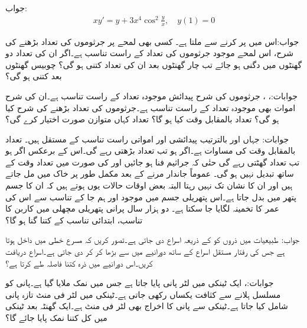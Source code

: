 جواب:
\begin{align*}
xy'=y+3x^4\cos^2 \frac{y}{x},\quad y(1)=0
\end{align*}

 جواب:اس میں  پر کرنے سے  ملتا ہے۔
کسی بھی لمحے پر جرثوموں کی تعداد بڑھنے کی شرح، اس لمحے موجود جرثوموں کی تعداد کے راست تناسب ہے۔اگر ان کی تعداد دو گھنٹوں میں دگنی ہو جائے تب چار گھنٹوں بعد ان کی تعداد کتنی ہو گی؟ چوبیس گھنٹوں بعد کتنی ہو گی؟  

جوابات:، ، 
جرثوموں کی شرح پیدائش موجودہ تعداد کے راست تناسب ہے۔ان کی شرح اموات بھی موجودہ تعداد کے راست تناسب ہے۔جرثوموں کی تعداد بڑھنے کی شرح کیا ہو گی؟ تعداد بالمقابل وقت کیا ہو گا؟ تعداد کہاں متوازن صورت اختیار کرے گی؟

جوابات: جہاں  اور  بالترتیب پیدائشی اور امواتی راست تناسب کے مستقل ہیں۔ تعداد بالمقابل وقت کی مساوات  ہے۔اگر  ہو تب تعداد بڑھتی رہے گی۔اس کے برعکس اگر  ہو تب تعداد گھٹتی رہے گی حتٰی کہ جراثیم فنا ہو جائیں اور  کی صورت میں تعداد وقت کے ساتھ تبدیل نہیں ہو گی۔ 
عموماً جاندار مرنے کے بعد مکمل طور پر خاک میں مل جاتے ہیں اور ان کا نشان تک نہیں رہتا البتہ بعض اوقات حالات یوں ہوتے ہیں کہ ان کا جسم پتھر میں بدل جاتا ہے۔اس پتھریلی جسم میں موجود  اور  ہم جا کے تناسب  سے اس کی عمر کا تخمینہ لگایا جا سکتا ہے۔ دو ہزار سال پرانی پتھریلی مچھلی  میں کاربن کا تناسب، ابتدائی تناسب کے کتنا گنا ہو گا؟

جواب:
طبیعیات میں  ذروں کو  کے ذریعہ اسراع دی جاتی ہے۔تصور کریں کہ مسرع خطی میں  داخل ہوتا ہے جس کی رفتار مستقل اسراع کے ساتھ  دورانیے میں  سے بڑھا کر  کر دی جاتی ہے۔اسراع دریافت کریں۔اس دورانیے میں ذرہ کتنا فاصلہ طے کرتا ہے؟

جوابات:،  
ایک ٹینکی میں  لٹر پانی پایا جاتا ہے جس میں  نمک ملایا گیا ہے۔پانی کو مسلسل ہلانے سے کثافت یکساں رکھی جاتی ہے۔ٹینکی میں  لٹر فی منٹ تازہ پانی شامل کیا جاتا ہے۔ٹینکی سے پانی کا اخراج بھی  لٹر فی منٹ ہے۔ایک گھنٹہ بعد ٹینکی میں کل کتنا نمک پایا جائے گا؟

